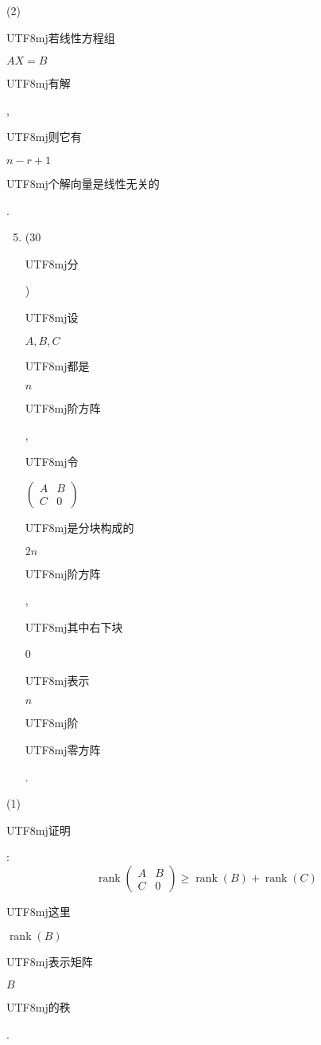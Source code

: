 \documentclass[10pt]{article}
\begin{document}
(2) \begin{CJK}{UTF8}{mj}若线性方程组\end{CJK} $A X=B$ \begin{CJK}{UTF8}{mj}有解\end{CJK}, \begin{CJK}{UTF8}{mj}则它有\end{CJK} $n-r+1$ \begin{CJK}{UTF8}{mj}个解向量是线性无关的\end{CJK}.

\begin{enumerate}
  \setcounter{enumi}{4}
  \item (30 \begin{CJK}{UTF8}{mj}分\end{CJK}) \begin{CJK}{UTF8}{mj}设\end{CJK} $A, B, C$ \begin{CJK}{UTF8}{mj}都是\end{CJK} $n$ \begin{CJK}{UTF8}{mj}阶方阵\end{CJK}, \begin{CJK}{UTF8}{mj}令\end{CJK} $\left(\begin{array}{cc}A & B \\ C & 0\end{array}\right)$ \begin{CJK}{UTF8}{mj}是分块构成的\end{CJK} $2 n$ \begin{CJK}{UTF8}{mj}阶方阵\end{CJK}, \begin{CJK}{UTF8}{mj}其中右下块\end{CJK} 0 \begin{CJK}{UTF8}{mj}表示\end{CJK} $n$ \begin{CJK}{UTF8}{mj}阶\end{CJK} \begin{CJK}{UTF8}{mj}零方阵\end{CJK}.
\end{enumerate}
(1) \begin{CJK}{UTF8}{mj}证明\end{CJK}:
$$
\operatorname{rank}\left(\begin{array}{cc}
A & B \\
C & 0
\end{array}\right) \geqslant \operatorname{rank}(B)+\operatorname{rank}(C)
$$
\begin{CJK}{UTF8}{mj}这里\end{CJK} $\operatorname{rank}(B)$ \begin{CJK}{UTF8}{mj}表示矩阵\end{CJK} $B$ \begin{CJK}{UTF8}{mj}的秩\end{CJK}.
\end{document}
